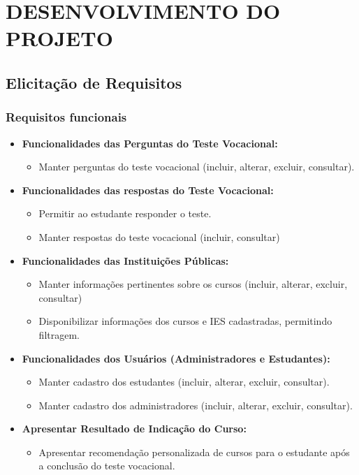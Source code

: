 \chapter{DESENVOLVIMENTO DO PROJETO}
\label{geral-requisitos-gerenciamento}

\section{Elicitação de Requisitos}
\subsection{Requisitos funcionais}

\begin{itemize}
    \item \textbf{Funcionalidades das Perguntas do Teste Vocacional:}

    \begin{itemize}
        \item Manter perguntas do teste vocacional (incluir, alterar, excluir, consultar).
    \end{itemize}
    
\item \textbf{Funcionalidades das respostas do Teste Vocacional:}
\begin{itemize}
        \item Permitir ao estudante responder o teste.
        \item Manter respostas do teste vocacional (incluir, consultar)
    \end{itemize}

\item \textbf{Funcionalidades das Instituições Públicas:}
\begin{itemize}
        \item Manter informações pertinentes sobre os cursos (incluir, alterar, excluir, consultar) 
        \item Disponibilizar informações dos cursos e IES cadastradas, permitindo filtragem.
    \end{itemize}

\item \textbf{Funcionalidades dos Usuários (Administradores e Estudantes):}
\begin{itemize}
        \item Manter cadastro dos estudantes (incluir, alterar, excluir, consultar).
        \item Manter cadastro dos administradores (incluir, alterar, excluir, consultar).
    \end{itemize}
    
\item \textbf{ Apresentar Resultado de Indicação do Curso:}
\begin{itemize}
        \item Apresentar recomendação personalizada de cursos para o estudante após a conclusão do teste vocacional.
    \end{itemize}
    
\end{itemize}
    
